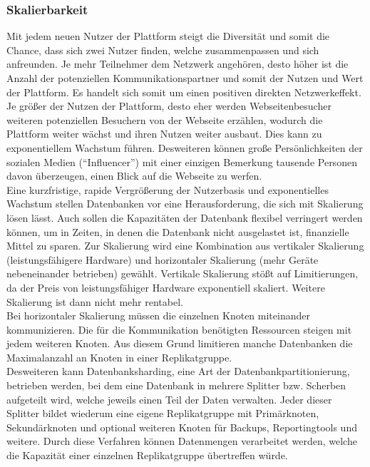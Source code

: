 \subsubsection{Skalierbarkeit}
Mit jedem neuen Nutzer der Plattform steigt die Diversität und somit die Chance, dass sich zwei Nutzer finden, welche zusammenpassen und sich anfreunden.
 Je mehr Teilnehmer dem Netzwerk angehören, desto höher ist die Anzahl der potenziellen Kommunikationspartner und somit der Nutzen und Wert der Plattform.
Es handelt sich somit um einen positiven direkten Netzwerkeffekt. \cite{db:networkEffect}
Je größer der Nutzen der Plattform, desto eher werden Webseitenbesucher weiteren potenziellen Besuchern von der Webseite erzählen, wodurch die Plattform weiter wächst und ihren Nutzen weiter ausbaut.
Dies kann zu exponentiellem Wachstum führen. \cite{db:networkEffectExponential}
Desweiteren können große Persönlichkeiten der sozialen Medien (\enquote{Influencer}) mit einer einzigen Bemerkung tausende Personen davon überzeugen, einen Blick auf die Webseite zu werfen. \\
Eine kurzfristige, rapide Vergrößerung der Nutzerbasis und exponentielles Wachstum stellen Datenbanken vor eine Herausforderung, die sich mit Skalierung lösen lässt.
Auch sollen die Kapazitäten der Datenbank flexibel verringert werden können, um in Zeiten, in denen die Datenbank nicht ausgelastet ist, finanzielle Mittel zu sparen.
Zur Skalierung wird eine Kombination aus vertikaler Skalierung (leistungsfähigere Hardware) und horizontaler Skalierung (mehr Geräte nebeneinander betrieben) gewählt.
Vertikale Skalierung stößt auf Limitierungen, da der Preis von leistungsfähiger Hardware exponentiell skaliert. \cite{db:verticalScaling}
Weitere Skalierung ist dann nicht mehr rentabel. \\
Bei horizontaler Skalierung müssen die einzelnen Knoten miteinander kommunizieren.
Die für die Kommunikation benötigten Ressourcen steigen mit jedem weiteren Knoten.
Aus diesem Grund limitieren manche Datenbanken die Maximalanzahl an Knoten in einer Replikatgruppe. \cite{db:mongoReplicaSetElections}\\
Desweiteren kann Datenbanksharding, eine Art der Datenbankpartitionierung, betrieben werden, bei dem eine Datenbank in mehrere Splitter bzw. Scherben aufgeteilt wird, welche jeweils einen Teil der Daten verwalten.
Jeder dieser Splitter bildet wiederum eine eigene Replikatgruppe mit Primärknoten, Sekundärknoten und optional weiteren Knoten für Backups, Reportingtools und weitere. \cite{db:mongoHiddenReplicaSetMembers} \cite{db:mongoDelayedReplicaSetMembers} \cite{db:mongoReplicaSetArbiter}
Durch diese Verfahren können Datenmengen verarbeitet werden, welche die Kapazität einer einzelnen Replikatgruppe übertreffen würde. \cite{db:sharding}

